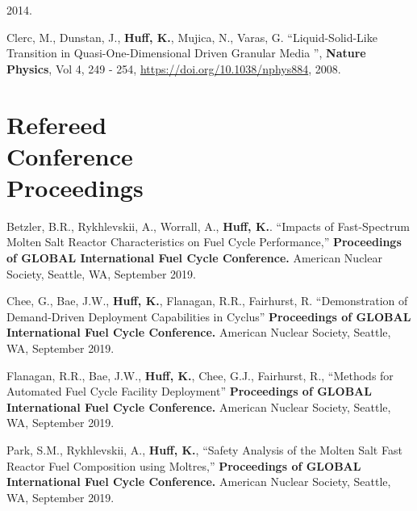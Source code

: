 \documentclass[margin,line]{resume}
\begin{document}
\begin{resume}
\begin{bibenum}
               2014.
       \item Clerc, M., Dunstan, J., \textbf{Huff, K.}, Mujica, N., Varas, G.
               ``Liquid-Solid-Like Transition in Quasi-One-Dimensional Driven
               Granular Media '',  \textbf{Nature Physics}, Vol 4, 249 - 254,
               \url{https://doi.org/10.1038/nphys884}, 2008.
      \end{bibenum}
    \section{\mysidestyle Refereed\\Conference\\Proceedings}
    \begin{bibenum}
    \item Betzler, B.R., Rykhlevskii, A., Worrall, A., \textbf{Huff, K.}.
            ``Impacts of Fast-Spectrum Molten Salt Reactor Characteristics on
            Fuel Cycle Performance,'' 
            \textbf{Proceedings of GLOBAL International Fuel Cycle Conference.}
            American Nuclear Society, Seattle, WA, September 2019.
    \item Chee, G., Bae, J.W., \textbf{Huff, K.}, Flanagan, R.R., Fairhurst, 
            R. ``Demonstration of Demand-Driven Deployment Capabilities in 
            Cyclus'' 
            \textbf{Proceedings of GLOBAL International Fuel Cycle Conference.}
            American Nuclear Society, Seattle, WA, September 2019.
    \item Flanagan, R.R., Bae, J.W., \textbf{Huff, K.}, Chee, G.J., 
            Fairhurst, R.,  ``Methods for Automated Fuel Cycle Facility 
            Deployment''
            \textbf{Proceedings of GLOBAL International Fuel Cycle Conference.}
            American Nuclear Society, Seattle, WA, September 2019.
    \item Park, S.M., Rykhlevskii, A., \textbf{Huff, K.}, ``Safety Analysis 
            of the Molten Salt Fast Reactor Fuel Composition using Moltres,''
            \textbf{Proceedings of GLOBAL International Fuel Cycle Conference.}
            American Nuclear Society, Seattle, WA, September 2019.

\end{bibenum}
\end{resume}
\end{document}
